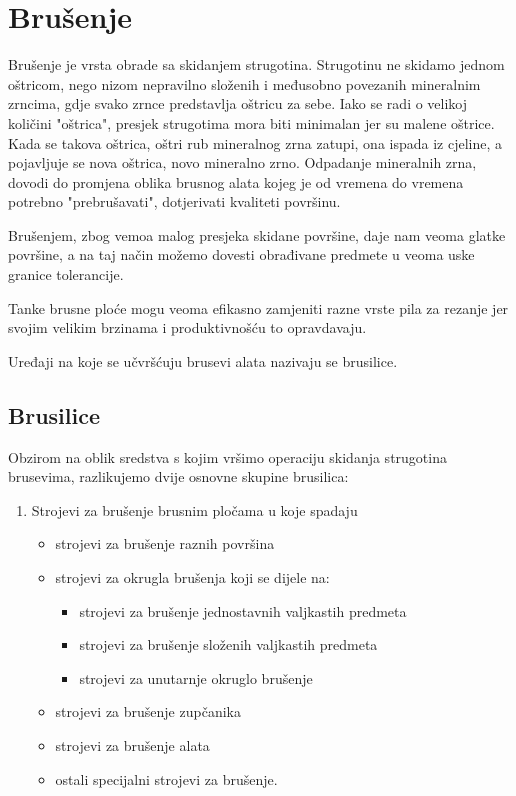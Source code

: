 \documentclass[a4paper,12pt]{article}
\numberwithin{figure}{section}
\begin{document}
\section{Brušenje}
Brušenje je vrsta obrade sa skidanjem strugotina. Strugotinu ne skidamo jednom oštricom, nego nizom nepravilno složenih i međusobno povezanih mineralnim zrncima, gdje svako zrnce predstavlja oštricu za sebe. Iako se radi o velikoj količini "oštrica", presjek strugotima mora biti minimalan jer su malene oštrice. Kada se takova oštrica, oštri rub mineralnog zrna zatupi, ona ispada iz cjeline, a pojavljuje se nova oštrica, novo mineralno zrno. Odpadanje mineralnih zrna, dovodi do promjena oblika brusnog alata kojeg je od vremena do vremena potrebno "prebrušavati", dotjerivati kvaliteti površinu.\par 
Brušenjem, zbog vemoa malog presjeka skidane površine, daje nam veoma glatke površine, a na taj način možemo dovesti obrađivane predmete u veoma uske granice tolerancije. \par
Tanke brusne ploće mogu veoma efikasno zamjeniti razne vrste pila za rezanje jer svojim velikim brzinama i produktivnošću to opravdavaju. \par
Uređaji na koje se učvršćuju brusevi alata nazivaju se brusilice.
\subsection{Brusilice}
Obzirom na oblik sredstva s kojim vršimo operaciju skidanja strugotina brusevima, razlikujemo dvije osnovne skupine brusilica:
\begin{enumerate}
\item Strojevi za brušenje brusnim pločama u koje spadaju
\begin{itemize}
\item strojevi za brušenje raznih površina
\item strojevi za okrugla brušenja koji se dijele na:
\begin{itemize}
\item strojevi za brušenje jednostavnih valjkastih predmeta
\item strojevi za brušenje složenih valjkastih predmeta
\item strojevi za unutarnje okruglo brušenje
\end{itemize}
\item strojevi za brušenje zupčanika
\item strojevi za brušenje alata
\item ostali specijalni strojevi za brušenje.
\end{itemize}
\end{enumerate}
\end{document}
